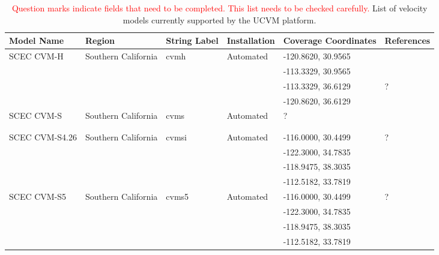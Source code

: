 
\begin{table*}[t]
\centering
\small
\caption{\textcolor{red}{Question marks indicate fields that need to be completed. This list needs to be checked carefully.} List of velocity models currently supported by the UCVM platform.}
\begin{tabular}[]{lllllp{1.25in}}
\\
Model Name         & Region                & String Label & Installation & Coverage Coordinates & References \\
\hline
SCEC CVM-H         & Southern California   & cvmh          &  Automated   & -120.8620, 30.9565 & \citet{Plesch_2011_SCEC}     \\
                   &                       &               &              & -113.3329, 30.9565 & \citet{CVM-H_Manual}         \\
                   &                       &               &              & -113.3329, 36.6129 & ?                            \\
                   &                       &               &              & -120.8620, 36.6129 &                              \\ 
SCEC CVM-S         & Southern California   & cvms          &  Automated   & ?                  & \citet{Magistrale_1996_BSSA} \\
                   &                       &               &              &                    & \citet{Magistrale_2000_BSSA} \\
                   &                       &               &              &                    & \citet{Kohler_2003_BSSA}     \\
SCEC CVM-S4.26     & Southern California   & cvmsi         &  Automated   & -116.0000, 30.4499 & ?                            \\
		   & 			   &		   &		  & -122.3000, 34.7835 &			      \\
		   &			   &		   &		  & -118.9475, 38.3035 &			      \\
		   &			   &		   &		  & -112.5182, 33.7819 &			      \\
SCEC CVM-S5        & Southern California   & cvms5         &  Automated   & -116.0000, 30.4499 & ?                            \\
		   & 			   &		   &		  & -122.3000, 34.7835 & 			      \\
		   &			   &		   &		  & -118.9475, 38.3035 & 			      \\
		   &			   &		   &		  & -112.5182, 33.7819 & 			      \\

\end{tabular}
\end{table*}
